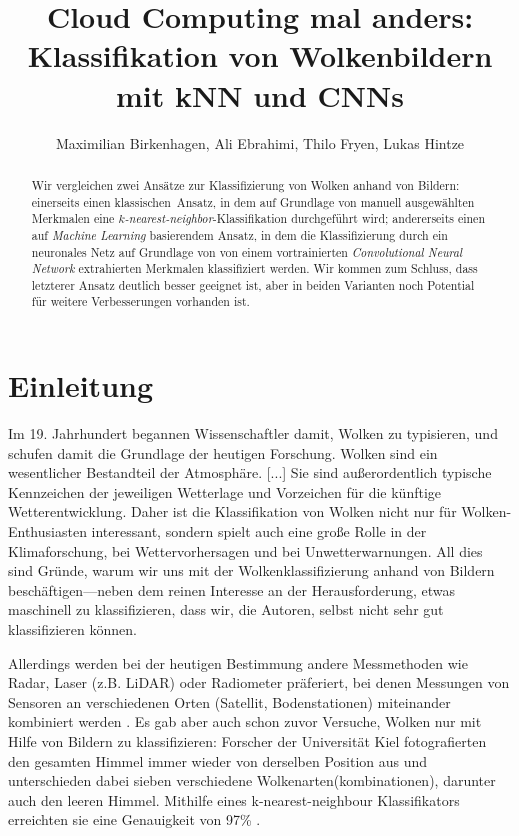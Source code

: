 \documentclass[a4,german]{article}
\begin{document}
\title{Cloud Computing mal anders: Klassifikation von Wolkenbildern mit kNN und CNNs}
\author{Maximilian Birkenhagen, Ali Ebrahimi, Thilo Fryen, Lukas Hintze}
\maketitle

\begin{abstract}
    Wir vergleichen zwei Ansätze zur Klassifizierung von Wolken anhand von Bildern:
        einerseits einen \glqq klassischen\grqq\ Ansatz, in dem auf Grundlage von manuell ausgewählten Merkmalen eine \emph{$k$-nearest-neighbor}-Klassifika\-tion durchgeführt wird;
        andererseits einen auf \emph{Machine Learning} basierendem Ansatz, in dem die Klassifizierung durch ein neuronales Netz auf Grundlage von von einem vortrainierten \emph{Convolutional Neural Network} extrahierten Merkmalen klassifiziert werden.
    Wir kommen zum Schluss, dass letzterer Ansatz deutlich besser geeignet ist, aber in beiden Varianten noch Potential für weitere Verbesserungen vorhanden ist.
\end{abstract}

\section{Einleitung}

Im 19. Jahrhundert begannen Wissenschaftler damit, Wolken zu typisieren, und schufen damit die Grundlage der heutigen Forschung. %
\glqq Wolken sind ein wesentlicher Bestandteil der Atmosphäre. [...] Sie sind außerordentlich typische Kennzeichen der jeweiligen Wetterlage und Vorzeichen für die künftige Wetterentwicklung.\grqq\cite{wolkenatlas:Karlsruhe}
Daher ist die Klassifikation von Wolken nicht nur für Wolken-Enthusiasten interessant, sondern spielt auch eine große Rolle in der Klimaforschung, bei Wettervorhersagen und bei Unwetterwarnungen.
All dies sind Gründe, warum wir uns mit der Wolkenklassifizierung anhand von Bildern beschäftigen---neben dem reinen Interesse an der Herausforderung, etwas maschinell zu klassifizieren, dass wir, die Autoren, selbst nicht sehr gut klassifizieren können.

Allerdings werden bei der heutigen Bestimmung andere Messmethoden wie Radar, Laser (z.B. LiDAR) oder Radiometer präferiert, bei denen Messungen von Sensoren an verschiedenen Orten (Satellit, Bodenstationen) miteinander kombiniert werden \cite{wang}.
Es gab aber auch schon zuvor Versuche, Wolken nur mit Hilfe von Bildern zu klassifizieren:
Forscher der Universität Kiel fotografierten den gesamten Himmel immer wieder von derselben Position aus und unterschieden dabei sieben verschiedene Wolkenarten(kombinationen), darunter auch den \glqq leeren Himmel\grqq.
Mithilfe eines k-nearest-neighbour Klassifikators erreichten sie eine Genauigkeit von 97\% \cite{heinle}.
\end{document}
